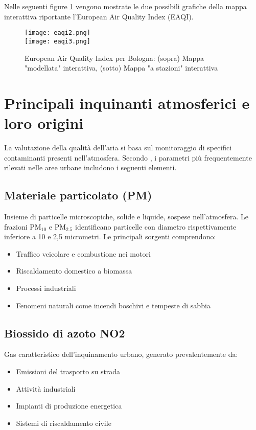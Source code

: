 Nelle seguenti figure \ref{fig:eaqi-combined} vengono mostrate le due possibili grafiche della mappa interattiva riportante l'European Air Quality Index (EAQI).

\begin{figure}[H]
  \centering
  \texttt{[image: eaqi2.png]}\\[1em]
  \texttt{[image: eaqi3.png]}
  \caption{European Air Quality Index per Bologna: (sopra) Mappa "modellata" interattiva, (sotto) Mappa "a stazioni" interattiva}
  \label{fig:eaqi-combined}
\end{figure}
\section{Principali inquinanti atmosferici e loro origini}

La valutazione della qualità dell'aria si basa sul monitoraggio di specifici contaminanti presenti nell'atmosfera.
Secondo \citet{GoogleMapsAirQuality2024}, i parametri più frequentemente rilevati nelle aree urbane includono i seguenti elementi.

\subsection{Materiale particolato (PM)}

Insieme di particelle microscopiche, solide e liquide, sospese nell'atmosfera.
Le frazioni PM$_{10}$ e PM$_{2.5}$ identificano particelle con diametro rispettivamente inferiore a 10 e 2,5 micrometri.
Le principali sorgenti comprendono:

\begin{itemize}
  \item Traffico veicolare e combustione nei motori
  \item Riscaldamento domestico a biomassa
  \item Processi industriali
  \item Fenomeni naturali come incendi boschivi e tempeste di sabbia
\end{itemize}

\subsection{Biossido di azoto NO2}

Gas caratteristico dell'inquinamento urbano, generato prevalentemente da:

\begin{itemize}
  \item Emissioni del trasporto su strada
  \item Attività industriali
  \item Impianti di produzione energetica
  \item Sistemi di riscaldamento civile
\end{itemize}

